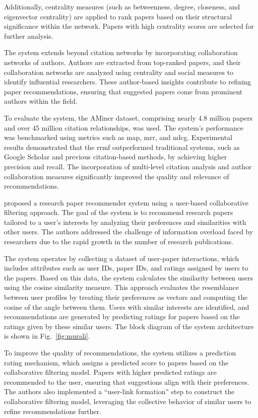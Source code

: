 Additionally, centrality measures (such as betweenness, degree, closeness, and eigenvector centrality) are applied to rank papers based on their structural significance within the network.
Papers with high centrality scores are selected for further analysis.

The system extends beyond citation networks by incorporating collaboration networks of authors.
Authors are extracted from top-ranked papers, and their collaboration networks are analyzed using centrality and social measures to identify influential researchers.
These author-based insights contribute to refining paper recommendations, ensuring that suggested papers come from prominent authors within the field.

To evaluate the system, the AMiner dataset, comprising nearly 4.8 million papers and over 45 million citation relationships, was used.
The system's performance was benchmarked using metrics such as \gls{map}, \gls{mrr}, and \gls{ndcg}.
Experimental results demonstrated that the \gls{rrmf} outperformed traditional systems, such as Google Scholar and previous citation-based methods, by achieving higher precision and recall.
The incorporation of multi-level citation analysis and author collaboration measures significantly improved the quality and relevance of recommendations.

\textcite{Murali2019} proposed a research paper recommender system using a user-based collaborative filtering approach.
The goal of the system is to recommend research papers tailored to a user's interests by analyzing their preferences and similarities with other users.
The authors addressed the challenge of information overload faced by researchers due to the rapid growth in the number of research publications.

The system operates by collecting a dataset of user-paper interactions, which includes attributes such as user IDs, paper IDs, and ratings assigned by users to the papers. Based on this data, the system calculates the similarity between users using the cosine similarity measure. This approach evaluates the resemblance between user profiles by treating their preferences as vectors and computing the cosine of the angle between them.
Users with similar interests are identified, and recommendations are generated by predicting ratings for papers based on the ratings given by these similar users.
The block diagram of the system architecture is shown in Fig.~\ref{fig:murali}.

To improve the quality of recommendations, the system utilizes a prediction rating mechanism, which assigns a predicted score to papers based on the collaborative filtering model.
Papers with higher predicted ratings are recommended to the user, ensuring that suggestions align with their preferences.
The authors also implemented a ``user-link formation'' step to construct the collaborative filtering model, leveraging the collective behavior of similar users to refine recommendations further.

